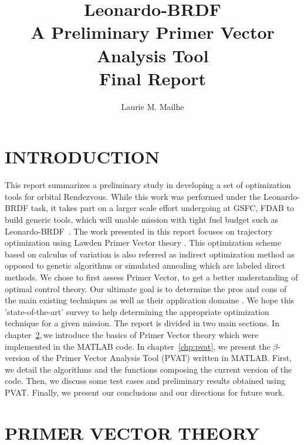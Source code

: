 \documentclass[12pt]{report}
\newcommand{\MT}{MATLAB}
\begin{document}
\title{ Leonardo-BRDF \\ A Preliminary Primer Vector Analysis Tool \\ Final Report}
\author{Laurie M. Mailhe }
\maketitle
\tableofcontents
\newpage
\chapter{INTRODUCTION}
This report summarizes a preliminary study in developing a set of
optimization tools for orbital Rendezvous.  While this work was
performed under the Leonardo-BRDF task, it takes part on a larger
scale effort undergoing at GSFC, FDAB to build generic tools,
which will unable mission with tight fuel budget such as
Leonardo-BRDF~\cite{Hugh00}.  The work presented in this report
focuses on trajectory optimization using Lawden Primer Vector
theory \cite{Lawden63}. This optimization scheme based on calculus
of variation is also referred as indirect optimization method as
opposed to genetic algorithms or simulated annealing which are
labeled direct methods.  We chose to first assess Primer Vector,
to get a better understanding of optimal control theory.  Our
ultimate goal is to determine the pros and cons of the main
existing techniques as well as their application domaine
\cite{Jezew91}.  We hope this 'state-of-the-art' survey to help
determining the appropriate optimization technique for a given
mission. The report is divided in two main sections. In
chapter~\ref{chp:pvt},\,we introduce the basics of Primer Vector
theory which were implemented in the \MT \,\,code. In
chapter~\ref{chp:pvat}, we present the $\beta$-version of the
Primer Vector Analysis Tool (PVAT) written in \MT.  First, we
detail the algorithms and the functions composing the current
version of the code. Then, we discuss some test cases and
preliminary results obtained using PVAT. Finally, we present our
conclusions and
our directions for future work.\\

\chapter{PRIMER VECTOR THEORY}\label{chp:pvt}
\end{document}
